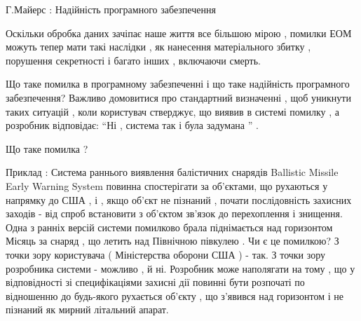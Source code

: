 Г.Майерс : Надійність програмного забезпечення

Оскільки обробка даних зачіпає наше життя все більшою мірою , помилки ЕОМ можуть тепер мати такі наслідки , як нанесення матеріального збитку , порушення секретності і багато інших , включаючи смерть.

Що таке помилка в програмному забезпеченні і що таке надійність програмного забезпечення? Важливо домовитися про стандартний визначенні , щоб уникнути таких ситуацій , коли користувач стверджує, що виявив в системі помилку , а розробник відповідає: ``Ні , система так і була задумана '' .

Що таке помилка ?

Приклад : Система раннього виявлення балістичних снарядів Ballistic Missile Early Warning System повинна спостерігати за об'єктами, що рухаються у напрямку до США , і , якщо об'єкт не пізнаний , почати послідовність захисних заходів - від спроб встановити з об'єктом зв'язок до перехоплення і знищення. Одна з ранніх версій системи помилково брала піднімається над горизонтом Місяць за снаряд , що летить над Північною півкулею . Чи є це помилкою? З точки зору користувача ( Міністерства оборони США ) - так. З точки зору розробника системи - можливо , й ні. Розробник може наполягати на тому , що у відповідності зі специфікаціями захисні дії повинні бути розпочаті по відношенню до будь-якого рухається об'єкту , що з'явився над горизонтом і не пізнаний як мирний літальний апарат.

